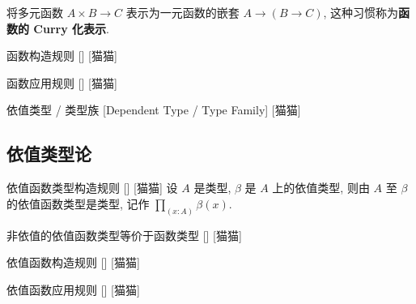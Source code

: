 \documentclass[UTF8]{ctexart}
\begin{document}
        \begin{rmk}
            [猫猫]
            将多元函数 \(A\times B\to C\) 表示为一元函数的嵌套 \(A\to (B\to C)\), 这种习惯称为\textbf{函数的 Curry 化表示}. 
        \end{rmk}
        
        \begin{axm}
            []
            {函数构造规则}
            []
            [猫猫]
        \end{axm}
        
        \begin{axm}
            []
            {函数应用规则}
            []
            [猫猫]
        \end{axm}
        
        \begin{dfn}
            {依值类型 / 类型族}
            [Dependent Type / Type Family]
            [猫猫]
        \end{dfn}
        

    \subsection{依值类型论}
        
        \begin{axm}
            []
            {依值函数类型构造规则}
            []
            [猫猫]
            设 \(A\) 是类型, \(\beta\) 是 \(A\) 上的依值类型, 则由 \(A\) 至 \(\beta\) 的依值函数类型是类型, 记作 \(\prod_{(x:A)} \beta(x)\). 
        \end{axm}
        
        \begin{ppt}
            []
            {非依值的依值函数类型等价于函数类型}
            []
            [猫猫]
        \end{ppt}

        \begin{axm}
            []
            {依值函数构造规则}
            []
            [猫猫]
        \end{axm}

        \begin{axm}
            []
            {依值函数应用规则}
            []
            [猫猫]
        \end{axm}

    
\end{document}
